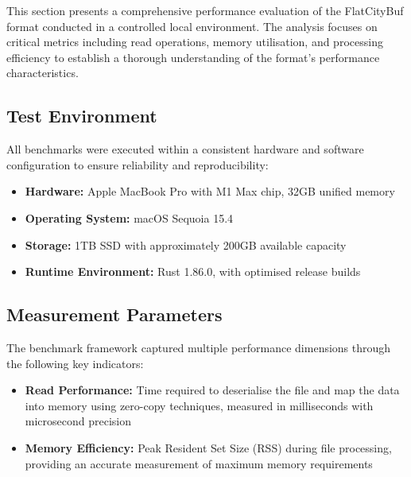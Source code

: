 This section presents a comprehensive performance evaluation of the FlatCityBuf format conducted in a controlled local environment. The analysis focuses on critical metrics including read operations, memory utilisation, and processing efficiency to establish a thorough understanding of the format's performance characteristics.

\subsection{Test Environment}
\label{result:benchmark_on_local_environment:test_environment}

All benchmarks were executed within a consistent hardware and software configuration to ensure reliability and reproducibility:

\begin{itemize}
  \item \textbf{Hardware:} Apple MacBook Pro with M1 Max chip, 32GB unified memory
  \item \textbf{Operating System:} macOS Sequoia 15.4
  \item \textbf{Storage:} 1TB SSD with approximately 200GB available capacity
  \item \textbf{Runtime Environment:} Rust 1.86.0, with optimised release builds
\end{itemize}

\subsection{Measurement Parameters}
\label{result:benchmark_on_local_environment:measurement_parameters}

The benchmark framework captured multiple performance dimensions through the following key indicators:

\begin{itemize}
  \item \textbf{Read Performance:} Time required to deserialise the file and map the data into memory using zero-copy techniques, measured in milliseconds with microsecond precision

  \item \textbf{Memory Efficiency:} Peak Resident Set Size (RSS) during file processing, providing an accurate measurement of maximum memory requirements

\end{itemize}

